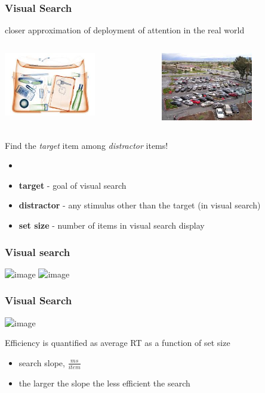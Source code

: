 \documentclass[]{beamer}
\begin{document}
\begin{frame}
 \frametitle{Visual Search}
\begin{overlayarea}{120mm}{70mm}
closer approximation of deployment of attention in the real world
\vspace{4mm}
\begin{columns}[T]
 \begin{column}{50mm}
\includegraphics[width=40mm]{figs/l8/suitcase_scan.jpg}
 \end{column}

 \begin{column}{60mm} 
\includegraphics[width=40mm]{figs/l8/car_in_parking_lot.jpg}
 \end{column}
\end{columns}

\vspace{4mm}
Find the \textit{target} item among \textit{distractor} items!
\begin{itemize}
 \item[] 
 \item<2->[] \textbf{target} - goal of visual search
 \item<2->[] \textbf{distractor} - any stimulus other than the target (in visual search)
 \item<2->[] \textbf{set size} - number of items in visual search display
\end{itemize}
\end{overlayarea}
\end{frame}

\begin{frame}
 \frametitle{Visual search}
\includegraphics<1>[width=110mm]{figs/l8/types_visual_search_displays.png}
\includegraphics<2>[width=110mm]{figs/l8/types_visual_search.png}
\end{frame}

\begin{frame}
 \frametitle{Visual Search}
\begin{center}
\includegraphics<1>[width=100mm]{figs/l8/types_visual_search_summary.png}
\end{center}

Efficiency is quantified as average RT as a function of set size 
\begin{itemize}
  \item search slope, $\frac{ms}{item}$
  \item the larger the slope the less efficient the search
 \end{itemize}
\end{frame}
\end{document}
